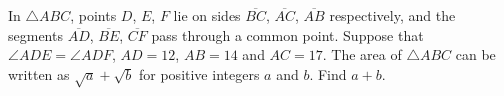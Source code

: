 In $\triangle ABC$, points $D$, $E$, $F$ lie on sides $\overline{BC}$, $\overline{AC}$, $\overline{AB}$ respectively, and the segments $\overline{AD}$, $\overline{BE}$, $\overline{CF}$ pass through a common point. Suppose that $\angle ADE=\angle ADF$, $AD=12$, $AB=14$ and $AC=17$. The area of $\triangle ABC$ can be written as $\sqrt a+\sqrt b$ for positive integers $a$ and $b$. Find $a+b$.
